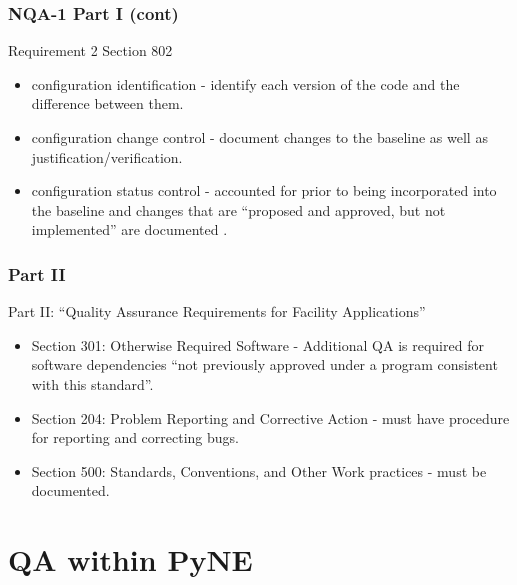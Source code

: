 \documentclass[12pt]{beamer}
\begin{document}
\begin{frame}
\frametitle{NQA-1 Part I (cont)}

Requirement 2 Section 802
\begin{itemize}
\item{\alert{configuration identification} - identify each version of the code and the difference between them.}
\item{\alert{configuration change control} - document changes to the baseline as well as justification/verification.}
\item{\alert{configuration status control} - accounted for prior to being incorporated into the baseline and changes that are “proposed and approved, but not implemented” are documented \cite{add}.}
\end{itemize}
\end{frame}
\begin{frame}
\frametitle{Part II}
Part II: ``Quality Assurance Requirements for Facility Applications''

\begin{itemize}
\item{Section 301: Otherwise Required Software - Additional QA is required for software dependencies ``not previously approved under a program consistent with this standard''.}
\item{Section 204: \alert{Problem Reporting} and \alert{Corrective Action} - must have procedure for reporting and correcting bugs}.
\item{Section 500: \alert{Standards}, \alert{Conventions}, and Other \alert{Work practices} - must be documented.}
\end{itemize}


\end{frame}

\section{QA within PyNE}
\end{document}
